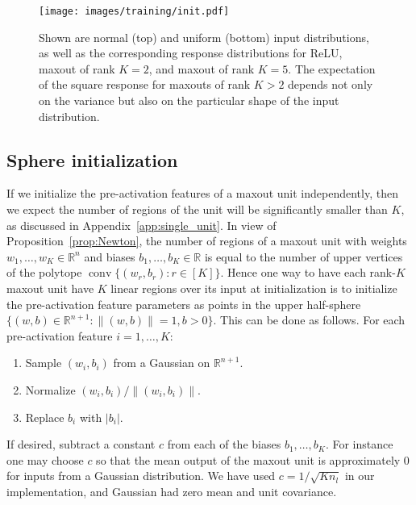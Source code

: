 \documentclass{article}
\theoremstyle{definition}
\begin{document}
\begin{figure}
    \centering
    \texttt{[image: images/training/init.pdf]}
    \caption{Shown are normal (top) and uniform (bottom) input distributions, as well as the corresponding response distributions for ReLU, maxout of rank $K=2$, and maxout of rank $K=5$. The expectation of the square response for maxouts of rank $K>2$ depends not only on the variance but also on the particular shape of the input distribution. }
    \label{fig:init}
\end{figure}
    
  \subsection{Sphere initialization}
  If we initialize the pre-activation features of a maxout unit independently, then we expect the number of regions of the unit will be significantly smaller than $K$, as discussed in Appendix~\ref{app:single_unit}.
  In view of Proposition~\ref{prop:Newton}, the number of regions of a maxout unit with weights $w_1,\ldots, w_K\in\mathbb{R}^n$ and biases $b_1,\ldots, b_K\in\mathbb{R}$ is equal to the number of upper vertices of the polytope $\operatorname{conv}\{(w_r,b_r)\colon r\in[K]\}$. 
  Hence one way to have each rank-$K$ maxout unit have $K$ linear regions over its input at initialization is to initialize the pre-activation feature parameters as points in the upper half-sphere $\{(w,b)\in\mathbb{R}^{n+1} \colon \|(w,b)\|=1, b>0\}$. 
  This can be done as follows.  
  For each pre-activation feature $i=1,\ldots, K$:  
  \begin{enumerate}[leftmargin=*]
    \item Sample $(w_i,b_i)$ from a Gaussian on $\mathbb{R}^{n+1}$. 
    \item Normalize $(w_i,b_i)/\|(w_i,b_i)\|$. 
    \item Replace $b_i$ with $|b_i|$.
  \end{enumerate}
  If desired, subtract a constant $c$ from each of the biases $b_1,\ldots, b_K$. 
  For instance one may choose $c$ so that the mean output of the maxout unit is approximately $0$ for inputs from a Gaussian distribution.
  We have used $c = 1 / \sqrt{K n_l}$ in our implementation, and Gaussian had zero mean and unit covariance. 
  
\end{document}
